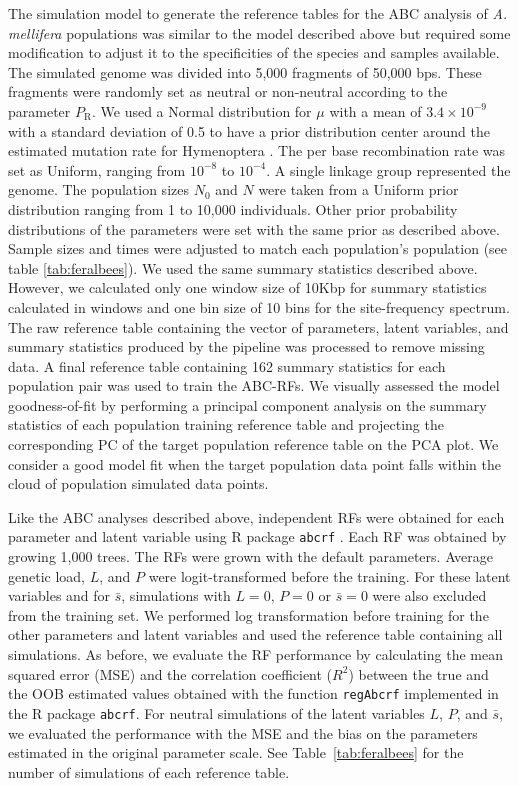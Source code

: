\documentclass[a4paper, 12pt]{article}
\begin{document}
The simulation model to generate the reference tables for the ABC analysis of \textit{A. mellifera} populations was similar to the model described above but required some modification to adjust it to the specificities of the species and samples available. The simulated genome was divided into 5,000 fragments of 50,000 bps. These fragments were randomly set as neutral or non-neutral according to the parameter $P_{\mathrm{R}}$. We used a Normal distribution for $\mu$ with a mean of $3.4\times 10^{-9}$ with a standard deviation of 0.5 to have a prior distribution center around the estimated mutation rate for Hymenoptera \citep{Liu:2017ea}. The per base recombination rate was set as Uniform, ranging from $10^{-8}$ to $10^{-4}$. A single linkage group represented the genome. The population sizes $N_{\mathrm{0}}$ and $N$ were taken from a Uniform prior distribution ranging from 1 to 10,000 individuals. Other prior probability distributions of the parameters were set with the same prior as described above. Sample sizes and times were adjusted to match each population's population (see table \ref{tab:feralbees}). We used the same summary statistics described above. However, we calculated only one window size of 10Kbp for summary statistics calculated in windows and one bin size of 10 bins for the site-frequency spectrum. The raw reference table containing the vector of parameters, latent variables, and summary statistics produced by the pipeline was processed to remove missing data. A final reference table containing 162 summary statistics for each population pair was used to train the ABC-RFs. We visually assessed the model goodness-of-fit by performing a principal component analysis on the summary statistics of each population training reference table and projecting the corresponding PC of the target population reference table on the PCA plot. We consider a good model fit when the target population data point falls within the cloud of population simulated data points.

Like the ABC analyses described above, independent RFs were obtained for each parameter and latent variable using R package \texttt{abcrf} \citep{Pudlo:2016il, Raynal:2019jj}. Each RF was obtained by growing 1,000 trees. The RFs were grown with the default parameters. Average genetic load, $L$, and $P$ were logit-transformed before the training. For these latent variables and for $\bar{s}$, simulations with $L=0$, $P=0$ or $\bar{s} = 0$ were also excluded from the training set. We performed log transformation before training for the other parameters and latent variables and used the reference table containing all simulations. As before, we evaluate the RF performance by calculating the mean squared error (MSE) and the correlation coefficient ($R^2$) between the true and the OOB estimated values obtained with the function \texttt{regAbcrf} implemented in the R package \texttt{abcrf}. For neutral simulations of the latent variables $L$, $P$, and $\bar{s}$, we evaluated the performance with the MSE and the bias on the parameters estimated in the original parameter scale. See Table~\ref{tab:feralbees} for the number of simulations of each reference table. 
\end{document}
